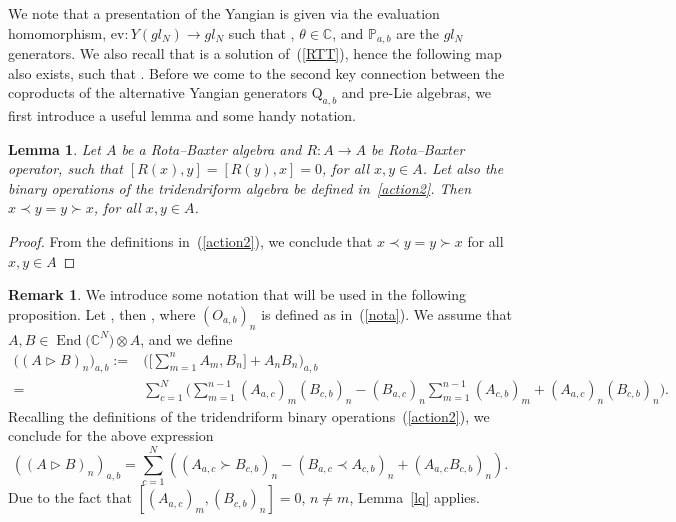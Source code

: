 \documentclass[10pt,a4paper]{amsart}
\numberwithin{equation}{section}
\newtheorem{lem}[thm]{Lemma}
\theoremstyle{definition}
\newtheorem{rem}[thm]{Remark}
\DeclareMathOperator{\EEnd}{End}%
\def\mathfrak#1{#1}%
\def\mathcal#1{#1}%
\begin{document}
We note that a presentation of the Yangian is given via the evaluation homomorphism, $\mbox{ev}\colon {\mathcal Y}(\mathfrak{gl}_{\mathcal N}) \to \mathfrak{gl}_{\mathcal N}$ such that , $\theta \in {\mathbb C}$, and
${\mathbb P}_{a,b}$ are the $\mathfrak{gl}_{\mathcal N}$ generators.
We also recall that  is a solution of~(\ref{RTT}), hence the following map also exists, \smash{$\sigma\colon {\mathcal Y}(\mathfrak{gl}_{\mathcal N}) \to \mathfrak{gl}_{\mathcal N}$} such that . Before we come to the second key connection between the coproducts of the alternative Yangian generators ${\mathrm Q}_{a, b}$ and pre-Lie algebras, we first introduce a useful lemma and some handy notation.

\begin{lem}{\label{lq}}
Let $\mathcal{A}$ be a Rota--Baxter algebra and $R\colon \mathcal{A} \to \mathcal{A}$ be Rota--Baxter operator, such that $[R(x), y] = [R(y), x] =0$, for all $x, y \in \mathcal{A}$. Let also the binary operations of the tridendriform algebra be defined in~\eqref{action2}. Then $x\prec y = y\succ x$, for all $x, y \in \mathcal{A}$.
\end{lem}
\begin{proof} From the definitions in~(\ref{action2}), we conclude that $x\prec y = y\succ x$ for all $x,y \in \mathcal{A}$
\end{proof}

\begin{rem}\label{nota2} We introduce some notation that will be used in the following proposition. Let \smash{${\mathcal O} \in \EEnd\bigl({\mathbb C}^{\mathcal N} \bigr) \otimes {\mathfrak A}$}, then \smash{${\mathcal O}_n =\sum_{a, b}^{\mathcal N}e_{a,b} \otimes ({\mathcal O}_{a,b})_n$}, where $({\mathcal O}_{a,b})_n $ is defined as in~(\ref{nota}). We assume that $A, B \in \EEnd\bigl({\mathbb C}^{\mathcal N} \bigr) \otimes {\mathfrak A}$, and we define
\begin{align*}
\bigl((A \triangleright B)_n\bigr)_{a,b} :={}& \Biggl(\Biggl[ \sum _{m=1}^n A_m, B_n \Biggr] + A_n B_n\Biggr)_{a,b} \\
={}& \sum_{c =1}^{\mathcal N} \Biggl( \sum_{m=1}^{n-1} (A_{a,c})_m (B_{c,b})_n- (B_{a,c})_n\sum_{m=1}^{n-1} (A_{c,b})_m + (A_{a,c})_n (B_{c,b})_n \Biggr). \nonumber
\end{align*}
Recalling the definitions of the tridendriform binary operations~(\ref{action2}), we conclude for the above expression
\begin{equation*}
((A \triangleright B)_n)_{a,b} = \sum_{c =1}^{\mathcal N} ( (A_{a,c} \succ B_{c,b})_n- (B_{a,c} \prec A_{c,b})_n + (A_{a,c} B_{c,b})_n).
\end{equation*}
Due to the fact that $[(A_{a,c})_m, (B_{c,b})_n] =0$, $n\neq m$, Lemma~\ref{lq} applies.
\end{rem}
\end{document}
